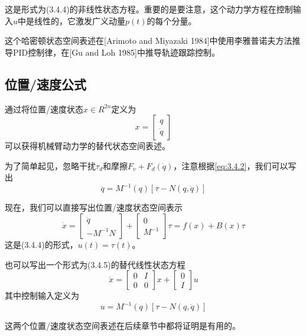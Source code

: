 \documentclass[12pt,a4paper]{ctexart}
\begin{document}
这是形式为(3.4.4)的非线性状态方程。重要的是要注意，这个动力学方程在控制输入$u$中是线性的，它激发广义动量$p(t)$的每个分量。

这个哈密顿状态空间表述在[Arimoto and Miyazaki 1984]中使用李雅普诺夫方法推导PID控制律，在[Gu and Loh 1985]中推导轨迹跟踪控制。

\subsection{位置/速度公式}

通过将位置/速度状态$x \in R^{2n}$定义为
\begin{equation}
x = \begin{bmatrix} q \\ \dot{q} \end{bmatrix}
\end{equation}
可以获得机械臂动力学的替代状态空间表述。

为了简单起见，忽略干扰$\tau_d$和摩擦$F_v + F_d(\dot{q})$，注意根据\eqref{eq:3.4.2}，我们可以写出
\begin{equation}
\ddot{q} = M^{-1}(q)[\tau - N(q,\dot{q})]
\end{equation}

现在，我们可以直接写出位置/速度状态空间表示
\begin{equation}
\dot{x} = \begin{bmatrix} \dot{q} \\ -M^{-1}N \end{bmatrix} + \begin{bmatrix} 0 \\ M^{-1} \end{bmatrix}\tau = f(x) + B(x)\tau
\end{equation}
这是(3.4.4)的形式，$u(t) = \tau(t)$。

也可以写出一个形式为(3.4.5)的替代线性状态方程
\begin{equation}\label{eq:3.4.22}
\dot{x} = \begin{bmatrix} 0 & I \\ 0 & 0 \end{bmatrix}x + \begin{bmatrix} 0 \\ I \end{bmatrix}u
\end{equation}
其中控制输入定义为
\begin{equation}
u = M^{-1}(q)[\tau - N(q,\dot{q})]
\end{equation}

这两个位置/速度状态空间表述在后续章节中都将证明是有用的。
\end{document}
